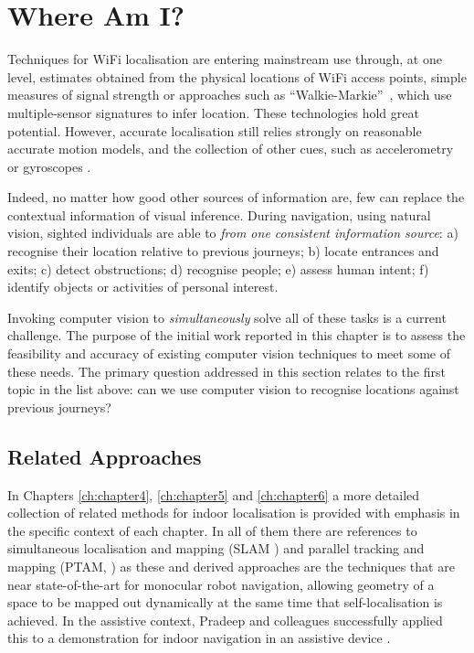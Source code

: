 
\section{Where Am I?}

Techniques for WiFi localisation are entering mainstream use through, at one level, estimates obtained from the physical locations of WiFi access points, simple measures of signal strength or approaches such as ``Walkie-Markie''~\cite{Shen}, which use mul\-ti\-ple\--sensor signatures to infer location.  These technologies hold great potential.  However, accurate localisation still relies strongly on reasonable accurate motion models, and the collection of other cues, such as accelerometry or gyroscopes \cite{Wang2012}.  

Indeed, no matter how good other sources of information are, few can replace the contextual information of visual inference.  During navigation, using natural vision, sighted individuals are able to {\em from one consistent information source}: a) recognise their location relative to previous journeys; b) locate entrances and exits; c) detect obstructions; d) recognise people; e) assess human intent;
f) identify objects or activities of personal interest.

Invoking computer vision to \textit{simultaneously} solve all of these tasks is a current challenge.  The purpose of the initial work reported in this chapter is to assess the feasibility and accuracy of existing computer vision techniques to meet some of these needs.  The primary question addressed in this section relates to the first topic in the list above: can we use computer vision to recognise locations against previous journeys?

\subsection{Related Approaches}
 
In Chapters \ref{ch:chapter4}, \ref{ch:chapter5} and \ref{ch:chapter6} a more detailed collection of related methods for indoor localisation is provided with emphasis in the specific context of each chapter. In all of them there are references to simultaneous localisation and mapping (SLAM \cite{Durrant-Whyte2006}) and parallel tracking and mapping (PTAM, \cite{klein2009parallel}) as these and derived approaches are the techniques that  are near state-of-the-art for monocular robot navigation, allowing geometry of a space to be mapped out dynamically at the same time that self-localisation is achieved.  In the assistive context, Pradeep and colleagues successfully applied this to a demonstration for indoor navigation in an assistive device \cite{Pradeep2010}.


